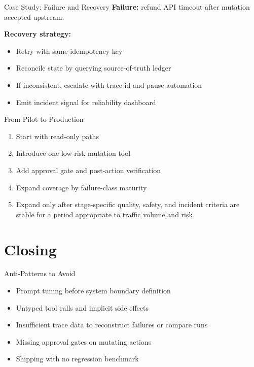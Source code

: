 \documentclass[aspectratio=169]{beamer}
\begin{document}
\begin{frame}{Case Study: Failure and Recovery}
  \textbf{Failure:} refund API timeout after mutation accepted upstream.

  \vspace{0.4em}
  \textbf{Recovery strategy:}
  \begin{itemize}
    \item Retry with same idempotency key
    \item Reconcile state by querying source-of-truth ledger
    \item If inconsistent, escalate with trace id and pause automation
    \item Emit incident signal for reliability dashboard
  \end{itemize}
\end{frame}

\begin{frame}{From Pilot to Production}
  \begin{enumerate}
    \item Start with read-only paths
    \item Introduce one low-risk mutation tool
    \item Add approval gate and post-action verification
    \item Expand coverage by failure-class maturity
    \item Expand only after stage-specific quality, safety, and incident criteria are stable for a period appropriate to traffic volume and risk
  \end{enumerate}
\end{frame}

\section{Closing}

\begin{frame}{Anti-Patterns to Avoid}
  \begin{itemize}
    \item Prompt tuning before system boundary definition
    \item Untyped tool calls and implicit side effects
    \item Insufficient trace data to reconstruct failures or compare runs
    \item Missing approval gates on mutating actions
    \item Shipping with no regression benchmark
  \end{itemize}
\end{frame}
\end{document}
